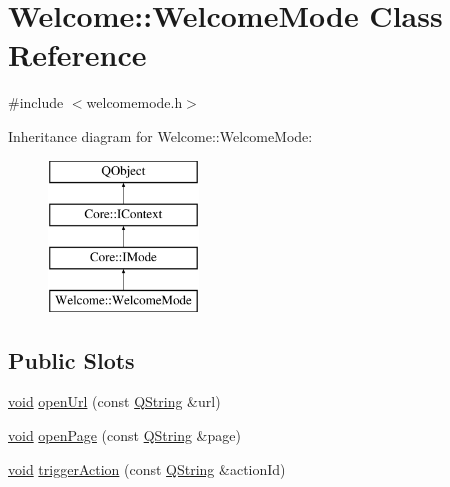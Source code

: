 \hypertarget{class_welcome_1_1_welcome_mode}{\section{Welcome\-:\-:Welcome\-Mode Class Reference}
\label{class_welcome_1_1_welcome_mode}
}


{\ttfamily \#include $<$welcomemode.\-h$>$}

Inheritance diagram for Welcome\-:\-:Welcome\-Mode\-:\begin{figure}[H]
\begin{center}
\leavevmode
\includegraphics[height=4.000000cm]{class_welcome_1_1_welcome_mode}
\end{center}
\end{figure}
\subsection*{Public Slots}
\begin{DoxyCompactItemize}
\item 
\hyperlink{group___u_a_v_objects_plugin_ga444cf2ff3f0ecbe028adce838d373f5c}{void} \hyperlink{group___welcome_plugin_ga7c451e1e31c9e70b1ba15be45ac25177}{open\-Url} (const \hyperlink{group___u_a_v_objects_plugin_gab9d252f49c333c94a72f97ce3105a32d}{Q\-String} \&url)
\item 
\hyperlink{group___u_a_v_objects_plugin_ga444cf2ff3f0ecbe028adce838d373f5c}{void} \hyperlink{group___welcome_plugin_gac98c3a91d41a1a3c391d5a4d1fd8ab92}{open\-Page} (const \hyperlink{group___u_a_v_objects_plugin_gab9d252f49c333c94a72f97ce3105a32d}{Q\-String} \&page)
\item 
\hyperlink{group___u_a_v_objects_plugin_ga444cf2ff3f0ecbe028adce838d373f5c}{void} \hyperlink{group___welcome_plugin_gabf623de0434e61036632f9a4dd3f06d3}{trigger\-Action} (const \hyperlink{group___u_a_v_objects_plugin_gab9d252f49c333c94a72f97ce3105a32d}{Q\-String} \&action\-Id)
\end{DoxyCompactItemize}
